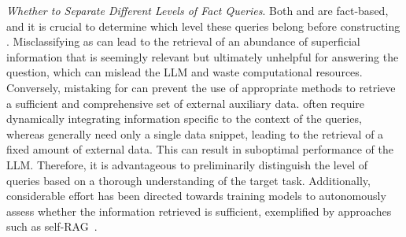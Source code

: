 \textit{Whether to Separate Different Levels of Fact Queries}.  Both \firstlevel and \secondlevel are fact-based, and it is crucial to determine which level these queries belong before constructing \app. Misclassifying \firstlevel as \secondlevel can lead to the retrieval of an abundance of superficial information that is seemingly relevant but ultimately unhelpful for answering the question, which can mislead the LLM and waste computational resources. Conversely, mistaking \secondlevel for \firstlevel can prevent the use of appropriate methods to retrieve a sufficient and comprehensive set of external auxiliary data. \MFUsentencecase{\secondlevel} often require dynamically integrating information specific to the context of the queries, whereas \firstlevel generally need only a single data snippet, leading to the retrieval of a fixed amount of external data. This can result in suboptimal performance of the LLM. Therefore, it is advantageous to preliminarily distinguish the level of queries based on a thorough understanding of the target task. Additionally, considerable effort has been directed towards training models to autonomously assess whether the information retrieved is sufficient, exemplified by approaches such as self-RAG~\cite{asai2023self}.